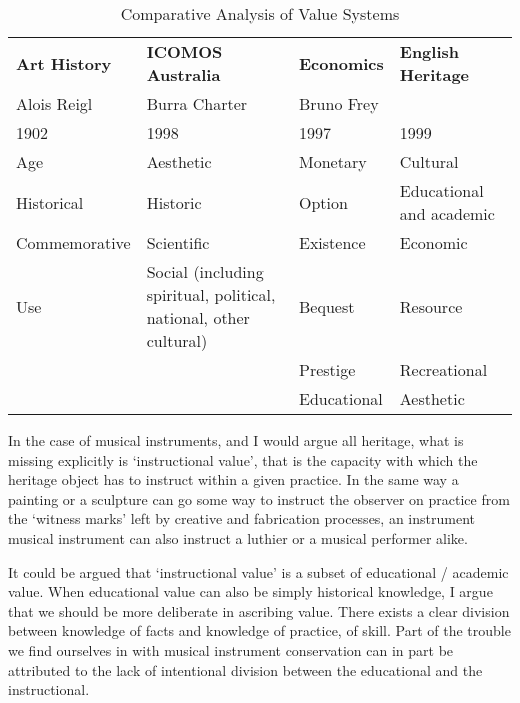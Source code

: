 \begin{table}[h]
    \centering
    \begin{adjustbox}{width=\textwidth}
        \begin{tabular}{llll}
            \toprule
            \textbf{Art History} & \textbf{ICOMOS Australia} & \textbf{Economics} & \textbf{English Heritage} \\
            Alois Reigl & Burra Charter & Bruno Frey &  \\ 
            1902 & 1998 & 1997 & 1999 \\ \hline
            Age& Aesthetic& Monetary & Cultural\\ 
             Historical &  Historic&  Option &  Educational and academic \\ 
             Commemorative& Scientific& Existence & Economic\\ 
             Use&  Social (including spiritual, 
    political, national, other 
    cultural)&  Bequest &  Resource \\ 
             & & Prestige & Recreational \\
             & & Educational & Aesthetic\\
        \end{tabular}
    \end{adjustbox}
    \caption{Comparative Analysis of Value Systems}
    \label{tab:values_comparison}
\end{table}

In the case of musical instruments, and I would argue all heritage, what is missing explicitly is `instructional value', that is the capacity with which the heritage object has to instruct within a given practice.
In the same way a painting or a sculpture can go some way to instruct the observer on practice from the `witness marks' left by creative and fabrication processes, an instrument musical instrument can also instruct a luthier or a musical performer alike.

It could be argued that `instructional value' is a subset of educational / academic value.
When educational value can also be simply historical knowledge, I argue that we should be more deliberate in ascribing value.
There exists a clear division between knowledge of facts and knowledge of practice, of skill.
Part of the trouble we find ourselves in with musical instrument conservation can in part be attributed to the lack of intentional division between the educational and the instructional.

